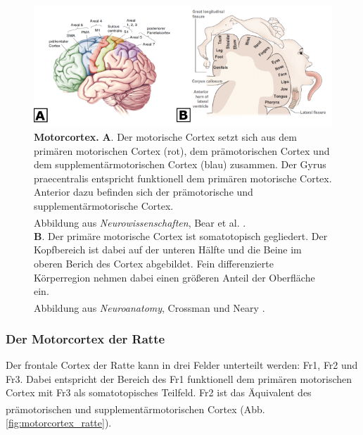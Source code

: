 \documentclass[12pt,a4paper,pdftex]{article}
\begin{document}
\begin{figure}[H]
    \centering
    \includegraphics[width=\textwidth]{pictures/Bilder_Laura/Motorcortex_2.png}
    \caption[Motorcortex]{\textbf{Motorcortex.} \textbf{A}. Der motorische Cortex setzt sich aus dem primären motorischen Cortex (rot), dem prämotorischen Cortex und dem supplementärmotorischen Cortex (blau) zusammen. Der Gyrus praecentralis entspricht funktionell dem primären motorische Cortex. Anterior dazu befinden sich der prämotorische und supplementärmotorische Cortex. \\
    Abbildung aus \textit{Neurowissenschaften}, Bear et al. \textsuperscript{\cite[14]{neurowissenschaften_baer}}.\\ \textbf{B}. Der primäre motorische Cortex ist somatotopisch gegliedert. Der Kopfbereich ist dabei auf der unteren Hälfte und die Beine im oberen Berich des Cortex abgebildet. Fein differenzierte Körperregion nehmen dabei einen größeren Anteil der Oberfläche ein. \\
    Abbildung aus \textit{Neuroanatomy}, Crossman und Neary \textsuperscript{\cite[8]{crossman2014neuroanatomy}}.}
    \label{fig:motorkortex}
\end{figure}

\subsubsection*{Der Motorcortex der Ratte}
Der frontale Cortex der Ratte kann in drei Felder unterteilt werden: Fr1, Fr2 und Fr3. 
Dabei entspricht der Bereich des Fr1 funktionell dem primären motorischen Cortex mit Fr3 als somatotopisches Teilfeld. Fr2 ist das Äquivalent des prämotorischen und supplementärmotorischen Cortex \textsuperscript{\cite[22]{paxinos2014rat}}(Abb. \ref{fig:motorcortex_ratte}).  
\end{document}
